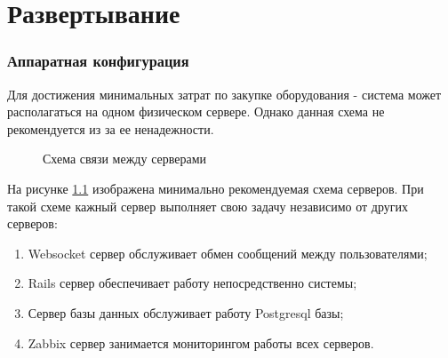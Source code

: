 \newpage
\chapter{Развертывание}
\subsection{Аппаратная конфигурация}
Для достижения минимальных затрат по закупке оборудования - система может
располагаться на одном физическом сервере. Однако данная схема не рекомендуется
из за ее ненадежности.

\begin{figure}[h]
\caption{Схема связи между серверами}
\label{ris:hardware_configuration}
\end{figure}

На рисунке \ref{ris:hardware_configuration} изображена минимально рекомендуемая
схема серверов. При такой схеме кажный сервер выполняет свою задачу независимо
от других серверов:
\begin{enumerate}
  \item Websocket сервер обслуживает обмен сообщений между пользователями;
  \item Rails сервер обеспечивает работу непосредственно системы;
  \item Сервер базы данных обслуживает работу Postgresql базы;
  \item Zabbix сервер занимается мониторингом работы всех серверов.
\end{enumerate}






